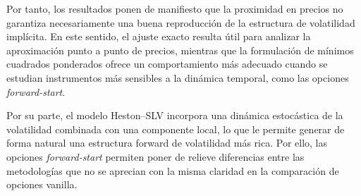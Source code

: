 Por tanto, los resultados ponen de manifiesto que la proximidad en precios no garantiza necesariamente una buena reproducción de la estructura de volatilidad implícita. En este sentido, el ajuste exacto resulta útil para analizar la aproximación punto a punto de precios, mientras que la formulación de mínimos cuadrados ponderados ofrece un comportamiento más adecuado cuando se estudian instrumentos más sensibles a la dinámica temporal, como las opciones \textit{forward-start}.\medskip

Por su parte, el modelo Heston--SLV incorpora una dinámica estocástica de la volatilidad combinada con una componente local, lo que le permite generar de forma natural una estructura forward de volatilidad más rica. Por ello, las opciones \textit{forward-start} permiten poner de relieve diferencias entre las metodologías que no se aprecian con la misma claridad en la comparación de opciones vanilla.


